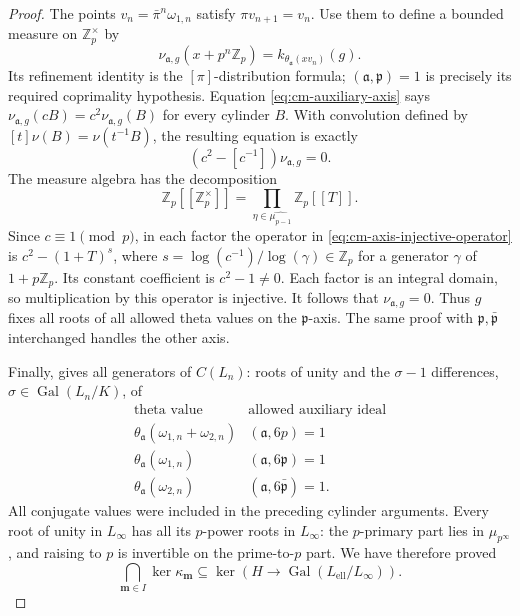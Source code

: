 \begin{proof}
The points \(v_n=\bar\pi^n\omega_{1,n}\) satisfy
\(\pi v_{n+1}=v_n\).
Use them to define a bounded measure on \(\mathbb Z_p^\times\) by
\[
 \nu_{\mathfrak a,g}(x+p^n\mathbb Z_p)
                    =k_{\theta_{\mathfrak a}(xv_n)}(g).
\]
Its refinement identity is the \([\pi]\)-distribution formula;
\((\mathfrak a,\mathfrak p)=1\) is precisely its required
coprimality hypothesis.
Equation \eqref{eq:cm-auxiliary-axis} says
\(\nu_{\mathfrak a,g}(cB)=c^2\nu_{\mathfrak a,g}(B)\)
for every cylinder \(B\).
With convolution defined by
\([t]\nu(B)=\nu(t^{-1}B)\), the resulting equation is exactly
\begin{equation}\label{eq:cm-axis-injective-operator}
                    (c^2-[c^{-1}])\nu_{\mathfrak a,g}=0.
\end{equation}
The measure algebra has the decomposition
\[
 \mathbb Z_p[[\mathbb Z_p^\times]]
   =\prod_{\eta\in\widehat{\mu_{p-1}}}\mathbb Z_p[[T]].
\]
Since \(c\equiv1\pmod p\), in each factor the operator in
\eqref{eq:cm-axis-injective-operator} is
\(c^2-(1+T)^s\), where
\(s=\log(c^{-1})/\log(\gamma)\in\mathbb Z_p\) for a generator
\(\gamma\) of \(1+p\mathbb Z_p\).
Its constant coefficient is \(c^2-1\ne0\).
Each factor is an integral domain, so multiplication by this
operator is injective.
It follows that \(\nu_{\mathfrak a,g}=0\).
Thus \(g\) fixes all roots of all allowed theta values on the
\(\mathfrak p\)-axis.  The same proof with
\(\mathfrak p,\bar{\mathfrak p}\) interchanged handles the other
axis.

Finally, \cite[Proposition 2.9, pp.~9--10]{IshiiSoule} gives all
generators of \(C(L_n)\): roots of unity and the
\(\sigma-1\) differences, \(\sigma\in\operatorname{Gal}(L_n/K)\),
of
\[
 \begin{array}{c|c}
 \text{theta value}&\text{allowed auxiliary ideal}\\ \hline
 \theta_{\mathfrak a}(\omega_{1,n}+\omega_{2,n})
                       &(\mathfrak a,6p)=1\\
 \theta_{\mathfrak a}(\omega_{1,n})
                       &(\mathfrak a,6\mathfrak p)=1\\
 \theta_{\mathfrak a}(\omega_{2,n})
                       &(\mathfrak a,6\bar{\mathfrak p})=1 .
 \end{array}
\]
All conjugate values were included in the preceding cylinder
arguments.
Every root of unity in \(L_\infty\) has all its \(p\)-power roots
in \(L_\infty\): the \(p\)-primary part lies in
\(\mu_{p^\infty}\), and raising to \(p\) is invertible on the
prime-to-\(p\) part.
We have therefore proved
\begin{equation}\label{eq:cm-radical-kernel-inclusion}
 \bigcap_{\boldsymbol m\in I}\ker\kappa_{\boldsymbol m}
        \subseteq
 \ker\!\left(H\longrightarrow
                  \operatorname{Gal}(L_{\mathrm{ell}}/L_\infty)\right).
\end{equation}


\end{proof}
